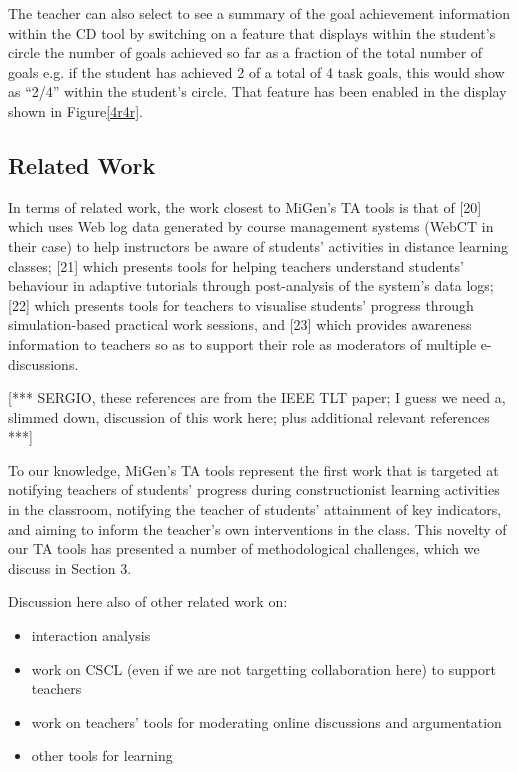 The teacher can also select to see a summary of the goal achievement
information within the CD tool by switching on a feature that displays
within the student’s circle the number of goals achieved so far as a
fraction of the total number of goals e.g. if the student has achieved
2 of a total of 4 task goals, this would show as “2/4” within the
student’s circle. That feature has been enabled in the display shown
in Figure\ref{4r4r}. 

\subsection{Related Work}
\label{sec:related}

In terms of related work, the work closest to MiGen’s TA tools is that
of [20] which uses Web log data generated by course management systems
(WebCT in their case) to help instructors be aware of students’
activities in distance learning classes; [21] which presents tools for
helping teachers understand students’ behaviour in adaptive tutorials
through post-analysis of the system’s data logs; [22] which presents
tools for teachers to visualise students’ progress through
simulation-based practical work sessions, and [23] which provides
awareness information to teachers so as to support their role as
moderators of multiple e-discussions.  

[*** SERGIO, these references are from the IEEE TLT paper; I guess we
need a, slimmed down, discussion of this work here; plus additional
relevant references ***] 
 
To our knowledge, MiGen’s TA tools represent the first work that is
targeted at notifying teachers of students’ progress during
constructionist learning activities in the classroom, notifying the
teacher of students’ attainment of key indicators, and aiming to
inform the teacher’s own interventions in the class. This novelty of
our TA tools has presented a number of methodological challenges,
which we discuss in Section 3.  

Discussion here also of other related work on: 
\begin{itemize}
\item  interaction analysis
\item  work on CSCL (even if we are not targetting collaboration here)
  to support teachers 
\item  work on teachers’ tools for moderating online discussions and
  argumentation 
\item  other tools for learning
\end{itemize}


